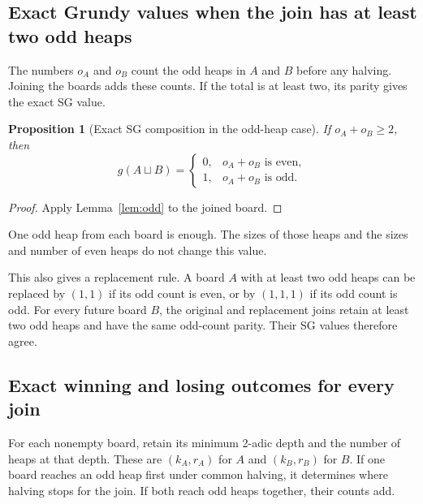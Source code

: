 \documentclass[11pt]{article}
\newtheorem{proposition}[theorem]{Proposition}
\newcommand{\join}{\sqcup}
\begin{document}
\subsection{Exact Grundy values when the join has at least two odd heaps}

The numbers $o_A$ and $o_B$ count the odd heaps in $A$ and $B$
before any halving. Joining the boards adds these counts.
If the total is at least two, its parity gives the exact SG value.

\begin{proposition}[Exact SG composition in the odd-heap case]
\label{prop:oddjoin}
If $o_A+o_B\ge2$, then
\[
 \boxed{g(A\join B)=
 \begin{cases}
 0,&o_A+o_B\text{ is even},\\
 1,&o_A+o_B\text{ is odd}.
 \end{cases}}
\]
\end{proposition}
\begin{proof}
Apply Lemma~\ref{lem:odd} to the joined board.
\end{proof}

One odd heap from each board is enough. The sizes of those heaps and
the sizes and number of even heaps do not change this value.

This also gives a replacement rule. A board $A$ with at least two
odd heaps can be replaced by $(1,1)$ if its odd count is even, or by
$(1,1,1)$ if its odd count is odd. For every future board $B$, the
original and replacement joins retain at least two odd heaps and
have the same odd-count parity. Their SG values therefore agree.

\subsection{Exact winning and losing outcomes for every join}

For each nonempty board, retain its minimum 2-adic depth and
the number of heaps at that depth. These are $(k_A,r_A)$ for
$A$ and $(k_B,r_B)$ for $B$. If one board reaches an odd heap
first under common halving, it determines where halving stops
for the join. If both reach odd heaps together, their counts add.
\end{document}
